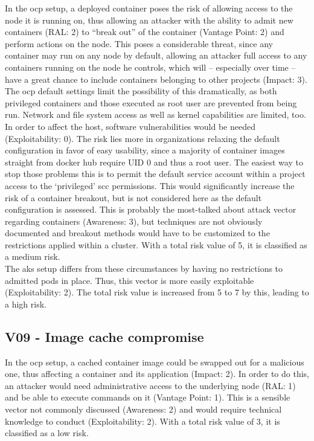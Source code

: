 In the \gls{ocp} setup, a deployed container poses the risk of allowing access to the node it is running on, thus allowing an attacker with the ability to admit new containers (RAL: 2) to “break out” of the container (Vantage Point: 2) and perform actions on the node.
This poses a considerable threat, since any container may run on any node by default, allowing an attacker full access to any containers running on the node he controls, which will – especially over time – have a great chance to include containers belonging to other projects (Impact: 3).
The \gls{ocp} default settings limit the possibility of this dramatically, as both privileged containers and those executed as root user are prevented from being run. Network and file system access as well as kernel capabilities are limited, too. In order to affect the host, software vulnerabilities would be needed (Exploitability: 0).
The risk lies more in organizations relaxing the default configuration in favor of easy usability, since a majority of container images straight from docker hub require UID 0 and thus a root user. The easiest way to stop those problems this is to permit the default service account within a project access to the ‘privileged’ \gls{scc} permissions. This would significantly increase the risk of a container breakout, but is not considered here as the default configuration is assessed.
This is probably the most-talked about attack vector regarding containers (Awareness: 3), but techniques are not obviously documented and breakout methods would have to be customized to the restrictions applied within a cluster.
With a total risk value of 5, it is classified as a medium risk. \\


The \gls{aks} setup differs from these circumstances by having no restrictions to admitted pods in place. Thus, this vector is more easily exploitable (Exploitability: 2).
The total risk value is increased from 5 to 7 by this, leading to a high risk.

\subsection{V09 - Image cache compromise}

In the \gls{ocp} setup, a cached container image could be swapped out for a malicious one, thus affecting a container and its application (Impact: 2). In order to do this, an attacker would need administrative access to the underlying node (RAL: 1) and be able to execute commands on it (Vantage Point: 1). This is a sensible vector not commonly discussed (Awareness: 2) and would require technical knowledge to conduct (Exploitability: 2).
With a total risk value of 3, it is classified as a low risk. \\

